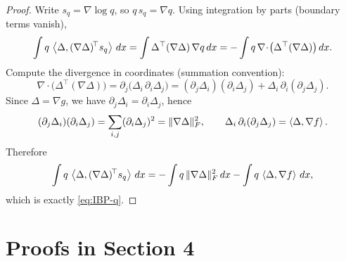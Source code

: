 \documentclass[12pt]{article}
\theoremstyle{definition} %
\begin{document}
\begin{proof}
Write $s_q=\nabla\log q$, so $q\,s_q=\nabla q$.
Using integration by parts (boundary terms vanish),
\[
\int q\,\left\langle \Delta,(\nabla\Delta)^{\!\top} s_q \right\rangle\,dx
=
\int \Delta^\top(\nabla\Delta)\,\nabla q\,dx
=
-\int q\,\nabla\!\cdot\!\big(\Delta^\top(\nabla\Delta)\big)\,dx.
\]
Compute the divergence in coordinates (summation convention):
\[
\nabla\!\cdot\!\big(\Delta^\top(\nabla\Delta)\big)
=
\partial_j\big(\Delta_i\,\partial_i\Delta_j\big)
=
(\partial_j\Delta_i)(\partial_i\Delta_j)+\Delta_i\,\partial_i(\partial_j\Delta_j).
\]
Since $\Delta=\nabla g$, we have $\partial_j\Delta_i=\partial_i\Delta_j$, hence
\[
(\partial_j\Delta_i)(\partial_i\Delta_j)=\sum_{i,j}(\partial_i\Delta_j)^2=\|\nabla\Delta\|_F^2,
\qquad
\Delta_i\,\partial_i(\partial_j\Delta_j)=\left\langle \Delta,\nabla f \right\rangle.
\]
Therefore
\[
\int q\,\left\langle \Delta,(\nabla\Delta)^{\!\top} s_q \right\rangle\,dx
=
-\int q\,\|\nabla\Delta\|_F^2\,dx
-\int q\,\left\langle \Delta,\nabla f \right\rangle\,dx,
\]
which is exactly \eqref{eq:IBP-q}.
\end{proof}




\section{Proofs in Section 4}\label{app:sec4-proofs}
\end{document}
